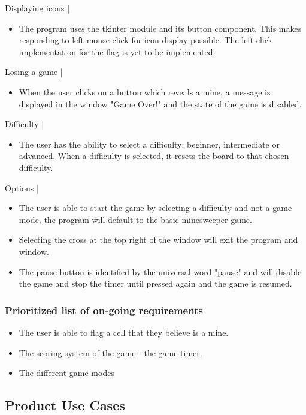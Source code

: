 \documentclass[12pt, a4]{report}
\begin{document}
		Displaying icons |
		\begin{itemize}
		\par
		\item The program uses the tkinter module and its button component. This makes responding to left mouse click for icon display possible. The left click implementation for the flag is yet to be implemented. 
		\end{itemize}
		Losing a game |
		\begin{itemize}
		\par 
		\item When the user clicks on a button which reveals a mine, a message is displayed in the window "Game Over!" and the state of the game is disabled. 
		\end{itemize}
		Difficulty |
		\begin{itemize}
		\par 
		\item The user has the ability to select a difficulty: beginner, intermediate or advanced. When a difficulty is 	selected, it resets the board to that chosen difficulty. 
		\end{itemize}
		Options |
		\begin{itemize}
		\par 
		\item The user is able to start the game by selecting a difficulty and not a game mode, the program will default to the basic minesweeper game. 
		\item Selecting the cross at the top right of the window will exit the program and window. 
		\item The pause button is identified by the universal word "pause" and will disable the game and stop the timer until pressed again and the game is resumed.
		\end{itemize}
			\subsubsection{Prioritized list of on-going requirements}
			\begin{itemize}
				\item The user is able to flag a cell that they believe is a mine.
				\item The scoring system of the game - the game timer. 
				\item The different game modes
			\end{itemize}	
		
	
	\subsection{Product Use Cases}
\end{document}
